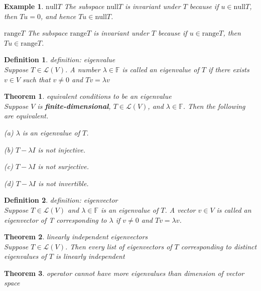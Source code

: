 \documentclass{article}
\newtheorem{theorem}{Theorem}[subsection]
\newtheorem{example}{Example}[subsection]
\newtheorem{definition}{Definition}[subsection]
\newcommand{\FF}{\mathbb{F}}
\newcommand{\range}{\text{range}}
\newcommand{\n}{\text{null}}
\begin{document}
\begin{CJK}{UTF8}{gkai}
\begin{example}
    $\n T$ The subspace $\n T$ is invariant under $T$ because if $u \in \n T$, then $Tu = 0$, and hence $Tu \in \n T$.

    $\range T$ The subspace $\range T$ is invariant under $T$ because if $u \in \range T$, then $Tu \in \range T$.
   
\end{example}

\begin{definition}
    definition: eigenvalue\\

    Suppose $T \in \mathcal{L}(V)$. A number $\lambda  \in \FF$ is called an eigenvalue of $T$ if there exists $v \in V$ such that $v \neq 0$ and $Tv = \lambda v$
\end{definition}

\begin{theorem}
    equivalent conditions to be an eigenvalue\\

    Suppose $V$ is \textbf{finite-dimensional}, $T \in \mathcal{L}(V)$, and $\lambda  \in \FF$. Then the following are equivalent.

    (a) $\lambda$  is an eigenvalue of $T$.

    (b) $T - \lambda I$ is not injective.

    (c) $T - \lambda I$ is not surjective.

    (d) $T - \lambda I$ is not invertible.
\end{theorem}

\begin{definition}
    definition: eigenvector\\
    
    Suppose $T \in \mathcal{L}(V)$ and $\lambda  \in \FF$ is an eigenvalue of $T$. A vector $v \in V$ is called an eigenvector of T corresponding to $\lambda$ if $v \neq 0$ and $Tv = \lambda v$.
\end{definition}

\begin{theorem}
    linearly independent eigenvectors\\

    Suppose $T \in \mathcal{L}(V)$. Then every list of eigenvectors of $T$ corresponding to distinct eigenvalues of $T$ is linearly independent
\end{theorem}

\begin{theorem}
    operator cannot have more eigenvalues than dimension of vector space\\


\end{theorem}
\end{CJK}
\end{document}
